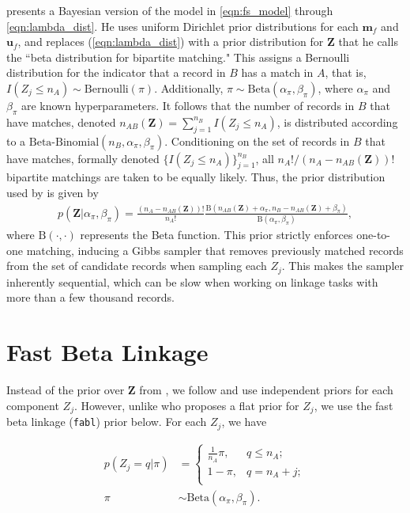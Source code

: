 \documentclass[ba]{imsart}
\begin{document}
\cite{sadinle_bayesian_2017} presents a Bayesian version of the model in \eqref{eqn:fs_model} through \eqref{eqn:lambda_dist}.  He uses uniform Dirichlet prior distributions for each $\bm{m}_f$ and $\bm{u}_f$, and replaces (\ref{eqn:lambda_dist}) with a prior distribution for $\bm{Z}$ that he calls the ``beta distribution for bipartite matching."  This assigns a Bernoulli distribution for the indicator that a record in $B$ has a match in $A$, that is, $I(Z_j \leq n_A) \sim \text{Bernoulli}(\pi)$.  Additionally, $\pi \sim \text{Beta}(\alpha_{\pi}, \beta_{\pi})$, where $\alpha_{\pi}$ and $\beta_{\pi}$ are known hyperparameters. It follows that the number of records in $B$ that have matches, denoted $n_{AB}(\bm{Z}) = \sum_{j=1}^{n_B} I(Z_j \leq n_A)$, is distributed according to a $\text{Beta-Binomial}(n_B, \alpha_{\pi}, \beta_{\pi})$. Conditioning on the set of records in $B$ that have matches, formally denoted $\{I(Z_j \leq n_A)\}_{j=1}^{n_B}$, all $n_A ! / (n_A - n_{AB}(\bm{Z}))!$ bipartite matchings are taken to be equally likely. Thus, the prior distribution used by \cite{sadinle_bayesian_2017} is given by
\begin{align}
\label{eqn:sadinle_prior}
p(\bm{Z}|\alpha_{\pi}, \beta_{\pi}) = \frac{(n_A - n_{AB}(\bm{Z}))!}{n_A !}\frac{\text{B}(n_{AB}(\bm{Z}) + \alpha_{\pi}, n_B - n_{AB}(\bm{Z}) + \beta_{\pi})}{\text{B}(\alpha_{\pi}, \beta_{\pi})},
\end{align}
where $\text{B}(\cdot, \cdot)$ represents the Beta function. This prior strictly enforces one-to-one matching, inducing a Gibbs sampler that removes previously matched records from the set of candidate records when sampling each $Z_j$. This makes the sampler inherently sequential, which can be slow when working on linkage tasks with more than a few thousand records.

\section{Fast Beta Linkage}
\label{sec:fast-beta-linkage}

Instead of the prior over $\bm{Z}$ from \cite{sadinle_bayesian_2017}, we follow \cite{wortman2019} and use independent priors for each component $Z_j$. However, unlike \cite{wortman2019} who proposes a flat prior for $Z_j$, we use the fast beta linkage (\texttt{fabl}) prior below. For each $Z_j$, we have

\begin{align}
	p(Z_j = q| \pi) &= \begin{cases} 
	\frac{1}{n_A}\pi,  & q \leq n_A;\\
	1-\pi, &  q  = n_A + j;  \\
\end{cases} \label{eqn:fast_beta_prior}  \\
\pi &\sim \text{Beta}(\alpha_{\pi}, \beta_{\pi}). \nonumber
\end{align}
\end{document}
